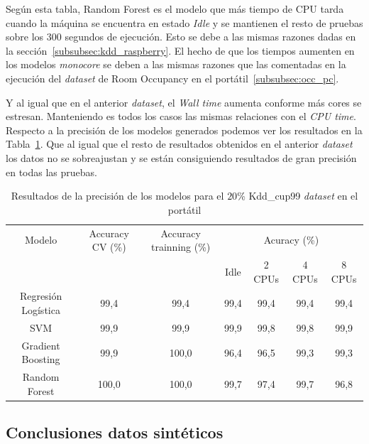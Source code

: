 \documentclass[a4paper, 12pt]{book}
\begin{document}
Según esta tabla, Random Forest es el modelo que más tiempo de CPU tarda cuando la máquina se encuentra en estado \textit{Idle} y se mantienen el resto de pruebas sobre los $300$ segundos de ejecución. Esto se debe a las mismas razones dadas en la sección~\ref{subsubsec:kdd_raspberry}. El hecho de que los tiempos aumenten en los modelos \textit{monocore} se deben a las mismas razones que las comentadas en la ejecución del \textit{dataset} de Room Occupancy en el portátil~\ref{subsubsec:occ_pc}.

Y al igual que en el anterior \textit{dataset}, el \textit{Wall time} aumenta conforme más cores se estresan. Manteniendo es todos los casos las mismas relaciones con el \textit{CPU time}.\\

Respecto a la precisión de los modelos generados podemos ver los resultados en la Tabla~\ref{tab:acc_Kddpc}. Que al igual que el resto de resultados obtenidos en el anterior \textit{dataset} los datos no se sobreajustan y se están consiguiendo resultados de gran precisión en todas las pruebas.\\
\begin{table}[htb]
\renewcommand{\arraystretch}{1.5}
\begin{adjustbox}{width=\textwidth}
\centering
    \begin{tabular}{c  c  c  c  c  c  c}
    \hline
    Modelo & Accuracy CV (\%) & Accuracy trainning (\%) & \multicolumn{4}{c}{Acuracy (\%)} \\
    \cline{4-7}
     &  &   &  Idle & 2 CPUs & 4 CPUs & 8 CPUs \\
     \hline
     Regresión Logística & 99,4 & 99,4 & 99,4 & 99,4 & 99,4 & 99,4\\
     SVM & 99,9 & 99,9 & 99,9 & 99,8 & 99,8 & 99,9\\
     Gradient Boosting & 99,9 & 100,0 & 96,4 & 96,5 & 99,3 & 99,3 \\
     Random Forest & 100,0 & 100,0 & 99,7 & 97,4 & 99,7 & 96,8\\
    \hline
    \end{tabular}
\end{adjustbox}
\caption{Resultados de la precisión de los modelos para el $20$\% Kdd\_cup99 \textit{dataset} en el portátil}
\label{tab:acc_Kddpc}
\end{table}

\subsection{Conclusiones datos sintéticos}
\label{subsec:conclusion_sinteticos}
\end{document}

